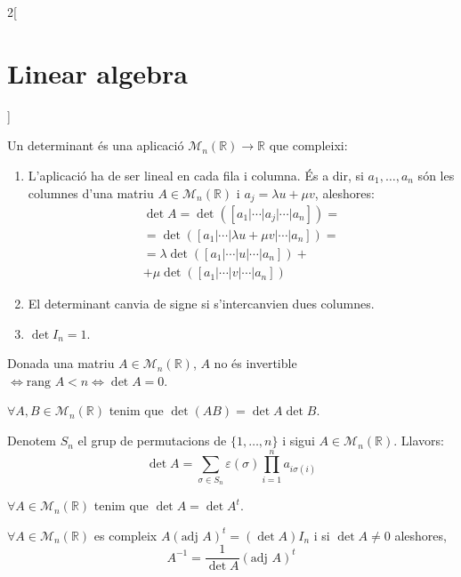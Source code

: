 \documentclass[../../../main.tex]{subfiles}
\begin{document}
\begin{multicols}{2}[\section{Linear algebra}]
\begin{theorem}
\end{theorem}
\begin{definition}
Un determinant és una aplicació $\mathcal{M}_n(\mathbb{R})\rightarrow\mathbb{R}$ que compleixi:
\begin{enumerate}
    \item L'aplicació ha de ser lineal en cada fila i columna. És a dir, si $a_1,\ldots,a_n$ són les columnes d'una matriu $A\in\mathcal{M}_n(\mathbb{R})$ i $a_j=\lambda u+\mu v$, aleshores:
    \begin{multline*}
        \det A=\det([a_1|\cdots|a_j|\cdots| a_n])=\\=\det([a_1|\cdots|\lambda u+\mu v|\cdots| a_n])=\\=\lambda\det([a_1|\cdots| u|\cdots| a_n])+\\+\mu\det([a_1|\cdots| v|\cdots| a_n])
    \end{multline*}
    \item El determinant canvia de signe si s'intercanvien dues columnes.
    \item $\det I_n=1$.
\end{enumerate}
\end{definition}
\begin{prop}
Donada una matriu $A\in\mathcal{M}_n(\mathbb{R})$, $A$ no és invertible $\iff\text{rang }A<n\iff\det A=0$.
\end{prop}
\begin{theorem}
$\forall A,B\in\mathcal{M}_n(\mathbb{R})$ tenim que $\det (AB)=\det A\det B$.
\end{theorem}
\begin{prop}
Denotem $S_n$ el grup de permutacions de $\{1,\ldots,n\}$ i sigui $A\in\mathcal{M}_n(\mathbb{R})$. Llavors: $$\det A=\sum_{\sigma\in S_n}\varepsilon(\sigma)\prod_{i=1}^na_{i\sigma(i)}$$
\end{prop}
\begin{prop}
$\forall A\in\mathcal{M}_n(\mathbb{R})$ tenim que $\det A=\det A^t$.
\end{prop}
\begin{theorem}
$\forall A\in\mathcal{M}_n(\mathbb{R})$ es compleix $A(\text{adj }A)^t=(\det A)I_n$ i si $\det A\ne 0$ aleshores, $$A^{-1}=\frac{1}{\det A}(\text{adj }A)^t$$
\end{theorem}

\end{multicols}
\end{document}
